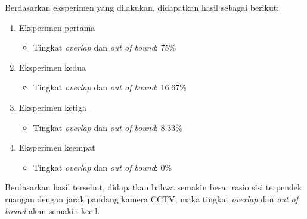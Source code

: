 Berdasarkan eksperimen yang dilakukan, didapatkan hasil sebagai berikut:
\begin{enumerate}
	\item Eksperimen pertama
	\begin{itemize}
		\item Tingkat \textit{overlap} dan \textit{out of bound}: 75\%
	\end{itemize}
		
	\item Eksperimen kedua
	\begin{itemize}
		\item Tingkat \textit{overlap} dan \textit{out of bound}: 16.67\%
	\end{itemize}
	
	\item Eksperimen ketiga
	\begin{itemize}
		\item Tingkat \textit{overlap} dan \textit{out of bound}: 8.33\%
	\end{itemize}
	\item Eksperimen keempat
	\begin{itemize}
		\item Tingkat \textit{overlap} dan \textit{out of bound}: 0\%
	\end{itemize}
\end{enumerate}
Berdasarkan hasil tersebut, didapatkan bahwa semakin besar rasio sisi terpendek ruangan dengan jarak pandang kamera CCTV, maka tingkat \textit{overlap} dan \textit{out of bound} akan semakin kecil.






















